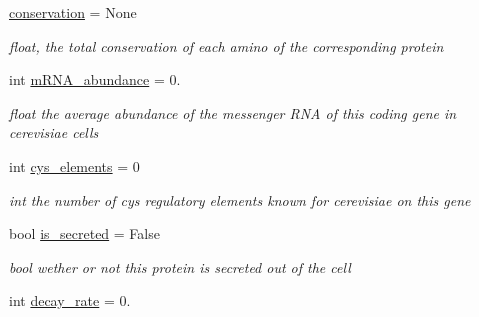 \begin{DoxyCompactItemize}
\mbox{\label{class_py_c_u_b_1_1homology_1_1homology_aa51ccde91bb3ca90cb11ae263627665a}} 
\mbox{\hyperlink{class_py_c_u_b_1_1homology_1_1homology_aa51ccde91bb3ca90cb11ae263627665a}{conservation}} = None
\begin{DoxyCompactList}\small\item\em float, the total conservation of each amino of the corresponding protein \end{DoxyCompactList}\item 
\mbox{\label{class_py_c_u_b_1_1homology_1_1homology_a0290845a014043ef7cef5994da0ea14f}} 
int \mbox{\hyperlink{class_py_c_u_b_1_1homology_1_1homology_a0290845a014043ef7cef5994da0ea14f}{m\+R\+N\+A\+\_\+abundance}} = 0.
\begin{DoxyCompactList}\small\item\em float the average abundance of the messenger R\+NA of this coding gene in cerevisiae cells \end{DoxyCompactList}\item 
\mbox{\label{class_py_c_u_b_1_1homology_1_1homology_a41ea8ca7536b4e7db86d9481f14c4c89}} 
int \mbox{\hyperlink{class_py_c_u_b_1_1homology_1_1homology_a41ea8ca7536b4e7db86d9481f14c4c89}{cys\+\_\+elements}} = 0
\begin{DoxyCompactList}\small\item\em int the number of cys regulatory elements known for cerevisiae on this gene \end{DoxyCompactList}\item 
\mbox{\label{class_py_c_u_b_1_1homology_1_1homology_a6318ac761caa41be6b784340bc3e9d7c}} 
bool \mbox{\hyperlink{class_py_c_u_b_1_1homology_1_1homology_a6318ac761caa41be6b784340bc3e9d7c}{is\+\_\+secreted}} = False
\begin{DoxyCompactList}\small\item\em bool wether or not this protein is secreted out of the cell \end{DoxyCompactList}\item 
\mbox{\label{class_py_c_u_b_1_1homology_1_1homology_a6bfbe5b4868039efca584fb13e3e17b4}} 
int \mbox{\hyperlink{class_py_c_u_b_1_1homology_1_1homology_a6bfbe5b4868039efca584fb13e3e17b4}{decay\+\_\+rate}} = 0.

\end{DoxyCompactItemize}
